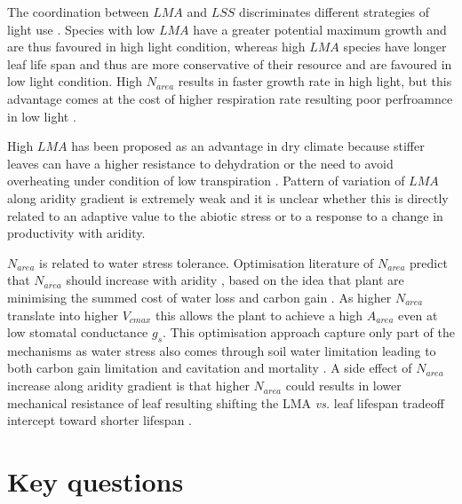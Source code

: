 \documentclass[a4paper,11pt]{article}
\begin{document}
The coordination between $LMA$ and $LSS$ discriminates different strategies of light use \citep{Falster-2018}. Species with low $LMA$ have a greater potential maximum growth and are thus favoured in high light condition, whereas high $LMA$ species have longer leaf life span and thus are more conservative of their resource and are favoured in low light condition. High $N_{area}$ results in faster growth rate in high light, but this advantage comes at the cost of higher respiration rate resulting poor perfroamnce in low light \citep{Falster-2018}.
 

High $LMA$ has been proposed as an advantage in dry climate because
stiffer leaves can have a higher resistance to dehydration
\citep{Wright-2002a,Wright-2002b} or the need to avoid overheating
under condition of low transpiration \citep{Leigh-2012}.
Pattern of variation of $LMA$ along aridity gradient is extremely weak and it is unclear whether this is directly related to an adaptive value to the abiotic stress or to a response to a change in productivity with aridity.
 
$N_{area}$ is related to water stress tolerance. Optimisation literature of $N_{area}$ predict that $N_{area}$ should
increase with aridity \citep{Wright-2003}, based on the idea that plant are minimising the summed cost of water
loss and carbon gain
\citep{Medlyn-2002,Wright-2003,Prentice-2014,Lu-2016,Wang-2017,Dong-2017}. As
higher $N_{area}$ translate into higher $V_{cmax}$ this allows the
plant to achieve a high $A_{area}$ even at low stomatal conductance
$g_s$. This optimisation approach capture only part of the mechanisms as water stress also comes through soil water limitation leading to both carbon gain limitation and cavitation and mortality \citep{Sperry-2016,Wolf-2016,Sperry-2017}. A side effect of $N_{area}$ increase along aridity gradient is that higher $N_{area}$ could results in lower mechanical resistance of leaf resulting shifting the LMA \textit{vs.} leaf lifespan tradeoff intercept toward shorter lifespan \citep{Wright-2002a}.

\section{Key questions}
\end{document}
